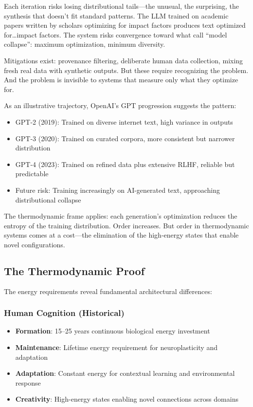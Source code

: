 Each iteration risks losing distributional tails---the unusual, the surprising, the synthesis that doesn't fit standard patterns. The LLM trained on academic papers written by scholars optimizing for impact factors produces text optimized for\ldots impact factors. The system risks convergence toward what \citet{shumailov2024} call ``model collapse'': maximum optimization, minimum diversity.

Mitigations exist: provenance filtering, deliberate human data collection, mixing fresh real data with synthetic outputs. But these require recognizing the problem. And the problem is invisible to systems that measure only what they optimize for.

As an illustrative trajectory, OpenAI's GPT progression suggests the pattern:
\begin{itemize}
\item GPT-2 (2019): Trained on diverse internet text, high variance in outputs
\item GPT-3 (2020): Trained on curated corpora, more consistent but narrower distribution
\item GPT-4 (2023): Trained on refined data plus extensive RLHF, reliable but predictable
\item Future risk: Training increasingly on AI-generated text, approaching distributional collapse
\end{itemize}

The thermodynamic frame applies: each generation's optimization reduces the entropy of the training distribution. Order increases. But order in thermodynamic systems comes at a cost---the elimination of the high-energy states that enable novel configurations.

\subsection{The Thermodynamic Proof}

The energy requirements reveal fundamental architectural differences:

\subsubsection{Human Cognition (Historical)}
\begin{itemize}
\item \textbf{Formation}: 15--25 years continuous biological energy investment
\item \textbf{Maintenance}: Lifetime energy requirement for neuroplasticity and adaptation
\item \textbf{Adaptation}: Constant energy for contextual learning and environmental response
\item \textbf{Creativity}: High-energy states enabling novel connections across domains
\end{itemize}

